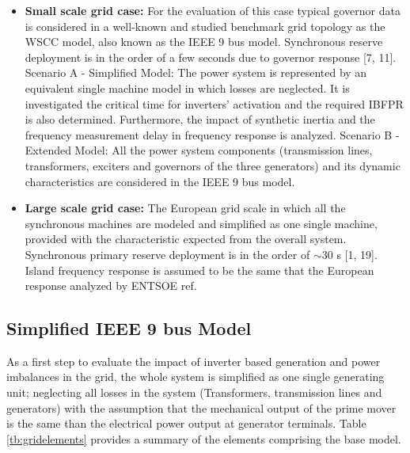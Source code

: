 \begin{itemize}[leftmargin=*,labelsep=5.8mm]
	\item \textbf{Small scale grid case:} For the evaluation of this case typical governor data is considered in a well-known and studied benchmark grid topology as the WSCC model, also known as the IEEE 9 bus model. Synchronous reserve deployment is in the order of a few seconds due to governor response [7, 11].
	\subitem Scenario A - Simplified Model: The power system is represented by an equivalent single machine model in which losses are neglected. It is investigated the critical time for inverters' activation and the required IBFPR is  also determined. Furthermore, the impact of synthetic inertia and the frequency measurement delay in frequency response is analyzed.
	\subitem Scenario B - Extended Model: All the power system components (transmission lines, transformers, exciters and governors of the three generators) and its dynamic characteristics are considered in the IEEE 9 bus model.\\
	\item \textbf{Large scale grid case:} The European grid scale in which all the synchronous machines are modeled and simplified as one single machine, provided with the characteristic expected from the overall system. Synchronous primary reserve deployment is in the order of $ \sim30 $ s [1, 19]. Island frequency response is assumed to be the same that the European response analyzed by ENTSOE ref.
\end{itemize}



\subsection{Simplified IEEE 9 bus Model}
\label{ssec:simpleieee}
As a first step to evaluate the impact of inverter based generation and power imbalances in the grid, the whole system is simplified as one single generating unit; neglecting all losses in the system (Transformers, transmission lines and generators) with the assumption that the mechanical output of the prime mover is the same than the electrical power output at generator terminals. Table \ref{tb:gridelements} provides a summary of the elements comprising the base model.\\

